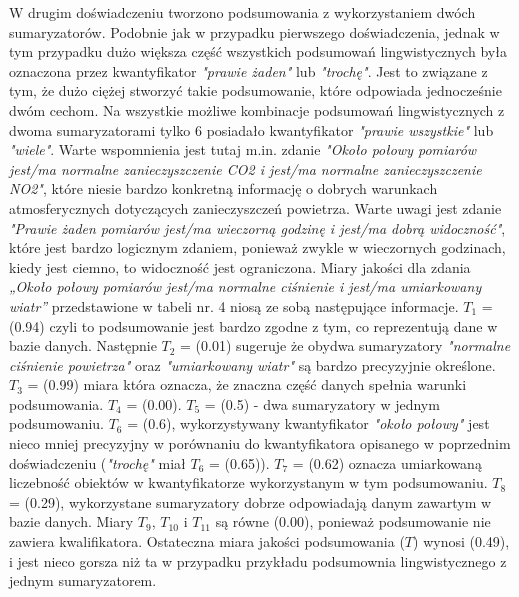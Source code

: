 \documentclass{article}
\begin{document}

W drugim doświadczeniu tworzono podsumowania z wykorzystaniem dwóch sumaryzatorów. Podobnie jak w przypadku pierwszego doświadczenia, jednak w tym przypadku dużo większa część wszystkich podsumowań lingwistycznych była oznaczona przez kwantyfikator \textit{"prawie żaden"} lub \textit{"trochę"}. Jest to związane z tym, że dużo ciężej stworzyć takie podsumowanie, które odpowiada jednocześnie dwóm cechom. Na wszystkie możliwe kombinacje podsumowań lingwistycznych z dwoma sumaryzatorami tylko 6 posiadało kwantyfikator \textit{"prawie wszystkie"} lub \textit{"wiele"}. Warte wspomnienia jest tutaj m.in. zdanie \textit{"Około połowy pomiarów jest/ma normalne zanieczyszczenie CO2 i jest/ma normalne zanieczyszczenie NO2"}, które niesie bardzo konkretną informację o dobrych warunkach atmosferycznych dotyczących zanieczyszczeń powietrza. Warte uwagi jest zdanie \textit{"Prawie żaden pomiarów jest/ma wieczorną godzinę i jest/ma dobrą widoczność"}, które jest bardzo logicznym zdaniem, ponieważ zwykle w wieczornych godzinach, kiedy jest ciemno, to widoczność jest ograniczona. Miary jakości dla zdania \textit{„Około połowy pomiarów jest/ma normalne ciśnienie i jest/ma umiarkowany wiatr”} przedstawione w tabeli nr. 4 niosą ze sobą następujące informacje. \(T_1\) = (0.94) czyli to podsumowanie jest bardzo zgodne z tym, co reprezentują dane w bazie danych. Następnie \(T_2\) = (0.01) sugeruje że obydwa sumaryzatory \textit{"normalne ciśnienie powietrza"} oraz \textit{"umiarkowany wiatr"} są bardzo precyzyjnie określone. \(T_3\) = (0.99) miara która oznacza, że znaczna część danych spełnia warunki podsumowania. \(T_4\) =  (0.00). \(T_5\) = (0.5) - dwa sumaryzatory w jednym podsumowaniu. \(T_6\) = (0.6), wykorzystywany kwantyfikator \textit{"około połowy"} jest nieco mniej precyzyjny w porównaniu do kwantyfikatora opisanego w poprzednim doświadczeniu (\textit{"trochę"} miał \(T_6\) = (0.65)). \(T_7\) = (0.62) oznacza umiarkowaną liczebność obiektów w kwantyfikatorze wykorzystanym w tym podsumowaniu. \(T_8\) = (0.29), wykorzystane sumaryzatory dobrze odpowiadają danym zawartym w bazie danych. Miary \(T_9\), \(T_{10}\) i \(T_{11}\) są równe (0.00), ponieważ podsumowanie nie zawiera kwalifikatora. Ostateczna miara jakości podsumowania (\(T\)) wynosi (0{.}49), i jest nieco gorsza niż ta w przypadku przykładu podsumownia lingwistycznego z jednym sumaryzatorem. \\
\end{document}
